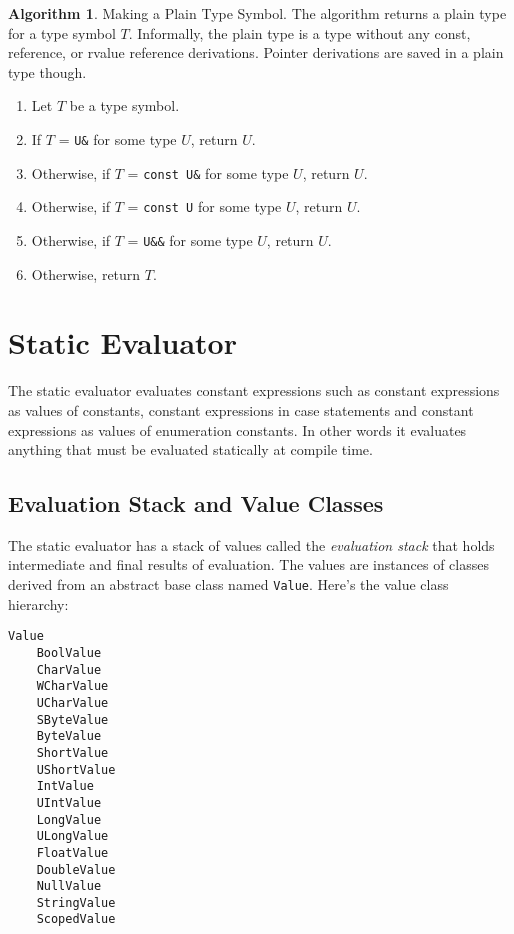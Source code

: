 \documentclass[a4paper,oneside,11pt]{book}
\theoremstyle{definition}
\newtheorem{algo}{Algorithm}[section]
\begin{document}
\begin{algo}\label{makeplaintype} Making a Plain Type Symbol.
The algorithm returns a plain type for a type symbol $T$.
Informally, the plain type is a type without any const, reference, or rvalue reference derivations.
Pointer derivations are saved in a plain type though.
\begin{enumerate}
\item
Let $T$ be a type symbol.
\item
If $T$ = \verb|U&| for some type $U$, return $U$.
\item
Otherwise, if $T$ = \verb|const U&| for some type $U$, return $U$.
\item
Otherwise, if $T$ = \verb|const U| for some type $U$, return $U$.
\item
Otherwise, if $T$ = \verb|U&&| for some type $U$, return $U$.
\item
Otherwise, return $T$.
\end{enumerate}
\end{algo}

\chapter{Static Evaluator}\label{evaluator}

The static evaluator evaluates constant expressions such as constant expressions as values of constants,
constant expressions in case statements and constant expressions as values of enumeration constants.
In other words it evaluates anything that must be evaluated statically at compile time.

\section{Evaluation Stack and Value Classes}

The static evaluator has a stack of values called the \emph{evaluation stack} that holds intermediate and final results of evaluation.
The values are instances of classes derived from an abstract base class named \verb|Value|.
Here's the value class hierarchy:

\begin{verbatim}
Value
    BoolValue
    CharValue
    WCharValue
    UCharValue
    SByteValue
    ByteValue
    ShortValue
    UShortValue
    IntValue
    UIntValue
    LongValue
    ULongValue
    FloatValue
    DoubleValue
    NullValue
    StringValue
    ScopedValue
\end{verbatim}
\end{document}
